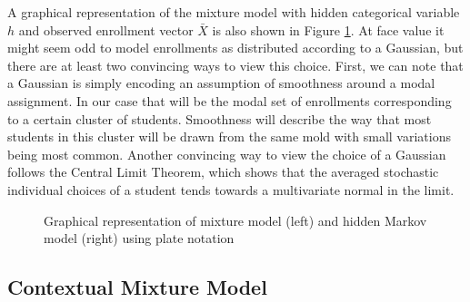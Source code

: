 \documentclass{edm_template}
\begin{document}
A graphical representation of the mixture model with hidden categorical variable $h$ and observed enrollment vector $\bar{X}$ is also shown in Figure \ref{fig:mixture_model}. At face value it might seem odd to model enrollments as distributed according to a Gaussian, but there are at least two convincing ways to view this choice. First, we can note that a Gaussian is simply encoding an assumption of smoothness around a modal assignment. In our case that will be the modal set of enrollments corresponding to a certain cluster of students. Smoothness will describe the way that most students in this cluster will be drawn from the same mold with small variations being most common. Another convincing way to view the choice of a Gaussian follows the Central Limit Theorem, which shows that the averaged stochastic individual choices of a student tends towards a multivariate normal in the limit.

\begin{figure}
	\centering
	\caption{\label{fig:mixture_model} Graphical representation of mixture model (left) and hidden Markov model (right) using plate notation}
\end{figure}

\subsection{Contextual Mixture Model}
\end{document}
